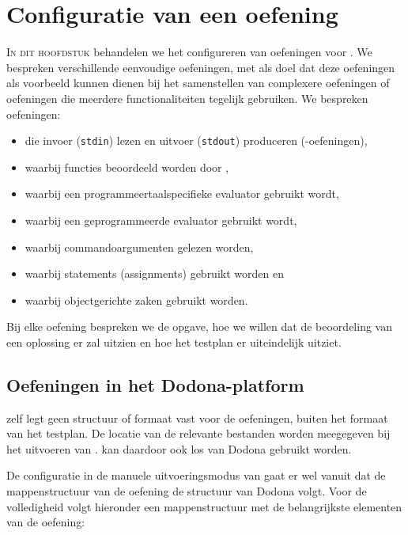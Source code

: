 \chapter{Configuratie van een oefening}\label{ch:nieuwe-oefening}

\lettrine{I}{n dit hoofdstuk} behandelen we het configureren van oefeningen voor \tested{}.
We bespreken verschillende eenvoudige oefeningen, met als doel dat deze oefeningen als voorbeeld kunnen dienen bij het samenstellen van complexere oefeningen of oefeningen die meerdere functionaliteiten tegelijk gebruiken.
We bespreken oefeningen:

\begin{itemize}
    \item die invoer (\texttt{stdin}) lezen en uitvoer (\texttt{stdout}) produceren (-oefeningen),
    \item waarbij functies beoordeeld worden door \tested{},
    \item waarbij een programmeertaalspecifieke evaluator gebruikt wordt,
    \item waarbij een geprogrammeerde evaluator gebruikt wordt,
    \item waarbij commandoargumenten gelezen worden,
    \item waarbij statements (assignments) gebruikt worden en
    \item waarbij objectgerichte zaken gebruikt worden.
\end{itemize}

Bij elke oefening bespreken we de opgave, hoe we willen dat de beoordeling van een oplossing er zal uitzien en hoe het testplan er uiteindelijk uitziet.

\section{Oefeningen in het Dodona-platform}\label{sec:oefeningen-in-het-dodona-platform}

\tested{} zelf legt geen structuur of formaat vast voor de oefeningen, buiten het formaat van het testplan.
De locatie van de relevante bestanden worden meegegeven bij het uitvoeren van \tested{}.
\tested{} kan daardoor ook los van Dodona gebruikt worden.

De configuratie in de manuele uitvoeringsmodus van \tested{} gaat er wel vanuit dat de mappenstructuur van de oefening de structuur van Dodona volgt.
Voor de volledigheid volgt hieronder een mappenstructuur met de belangrijkste elementen van de oefening:

